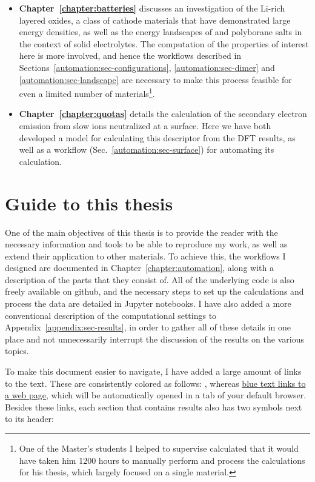 \begin{refsection}
\begin{itemize}[]
\item \textbf{Chapter~\ref{chapter:batteries}} discusses an investigation of the Li-rich layered oxides, a class of cathode materials that have demonstrated large energy densities, as well as the energy landscapes of  and  polyborane salts in the context of solid electrolytes. The computation of the properties of interest here is more involved, and hence the workflows described in Sections~\ref{automation:sec-configurations}, \ref{automation:sec-dimer} and \ref{automation:sec-landscape} are necessary to make this process feasible for even a limited number of materials\footnote{One of the Master's students I helped to supervise calculated that it would have taken him 1200 hours to manually perform and process the calculations for his thesis, which largely focused on a single material.}.

\item \textbf{Chapter~\ref{chapter:quotas}} details the calculation of the secondary electron emission from slow ions neutralized at a surface. Here we have both developed a model for calculating this descriptor from the \gls{DFT} results, as well as a workflow (Sec.~\ref{automation:sec-surface}) for automating its calculation.

\end{itemize}

\section{Guide to this thesis} \label{intro:sec-guide}

One of the main objectives of this thesis is to provide the reader with the necessary information and tools to be able to reproduce my work, as well as extend their application to other materials. To achieve this, the workflows I designed are documented in Chapter~\ref{chapter:automation}, along with a description of the parts that they consist of. All of the underlying code is also freely available on github, and the necessary steps to set up the calculations and process the data are detailed in Jupyter notebooks. I have also added a more conventional description of the computational settings to Appendix~\ref{appendix:sec-results}, in order to gather all of these details in one place and not unnecessarily interrupt the discussion of the results on the various topics.


To make this document easier to navigate, I have added a large amount of links to the text. These are consistently colored as follows: , whereas \href{https://github.com/mbercx/phd-thesis}{blue text links to a web page}, which will be automatically opened in a tab of your default browser. Besides these links, each section that contains results also has two symbols next to its header:


\end{refsection}
